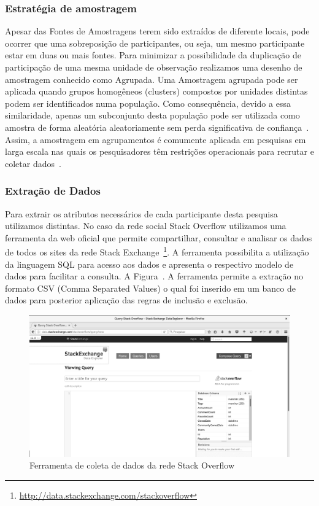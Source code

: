 \subsubsection{Estratégia de amostragem}

Apesar das Fontes de Amostragens terem sido extraídos de diferente locais, pode
ocorrer que uma sobreposição de participantes, ou seja, um mesmo participante
estar em duas ou mais fontes. Para minimizar a possibilidade da duplicação de
participação de uma mesma unidade de observação realizamos uma  desenho de
amostragem conhecido como Agrupada. Uma Amostragem agrupada pode ser aplicada
quando grupos homogêneos (clusters) compostos por unidades distintas podem ser
identificados numa população. Como consequência, devido a essa similaridade,
apenas um subconjunto desta população pode ser utilizada como amostra de forma
aleatória aleatoriamente sem perda significativa de
confiança~\cite{thompson2012sampling}. Assim, a amostragem em  agrupamentos é
comumente aplicada em pesquisas em larga escala nas quais os pesquisadores têm
restrições operacionais para recrutar e coletar
dados~\cite{roberts2004mortality}.

\subsubsection{Extração de Dados}

Para extrair os atributos necessários de cada participante desta pesquisa
utilizamos distintas. No caso da rede social Stack Overflow utilizamos uma
ferramenta da web oficial que permite compartilhar, consultar e analisar os
dados de todos os sites da rede Stack
Exchange~\footnote{\url{http://data.stackexchange.com/stackoverflow}}. A
ferramenta possibilita a utilização da linguagem SQL para acesso aos dados e
apresenta o respectivo modelo de dados para facilitar a consulta. A
Figura~\cite{fig:stack-exchange}. A ferramenta permite a extração no formato CSV
(Comma Separated Values) o qual foi inserido em um banco de dados para posterior
aplicação das regras de inclusão e exclusão.

\begin{figure}[htpb]
	\centering
	\includegraphics[width=0.8\linewidth]{./chapter-pesquisa-com-profissionais/img/stack-exchange.png}
	\caption{Ferramenta de coleta de dados da rede Stack Overflow}
\label{fig:stack-exchange}
\end{figure}

